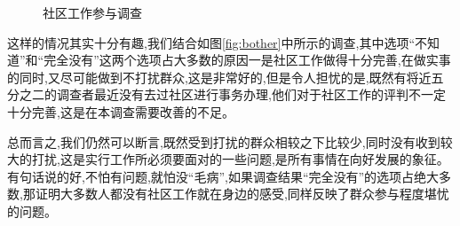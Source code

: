 \documentclass[AutoFakeBold]{LZUThesis}
\begin{document}
\begin{figure}[!h]
	\centering
	\hspace{0 pt}
	\caption{社区工作参与调查}
	
\end{figure}

这样的情况其实十分有趣,我们结合如图\ref{fig:bother}中所示的调查,其中选项“不知道”和“完全没有”这两个选项占大多数的原因一是社区工作做得十分完善,在做实事的同时,又尽可能做到不打扰群众,这是非常好的,但是令人担忧的是,既然有将近五分之二的调查者最近没有去过社区进行事务办理,他们对于社区工作的评判不一定十分完善,这是在本调查需要改善的不足。

总而言之,我们仍然可以断言,既然受到打扰的群众相较之下比较少,同时没有收到较大的打扰,这是实行工作所必须要面对的一些问题,是所有事情在向好发展的象征。有句话说的好,不怕有问题,就怕没“毛病”,如果调查结果“完全没有”的选项占绝大多数,那证明大多数人都没有社区工作就在身边的感受,同样反映了群众参与程度堪忧的问题。
\end{document}
